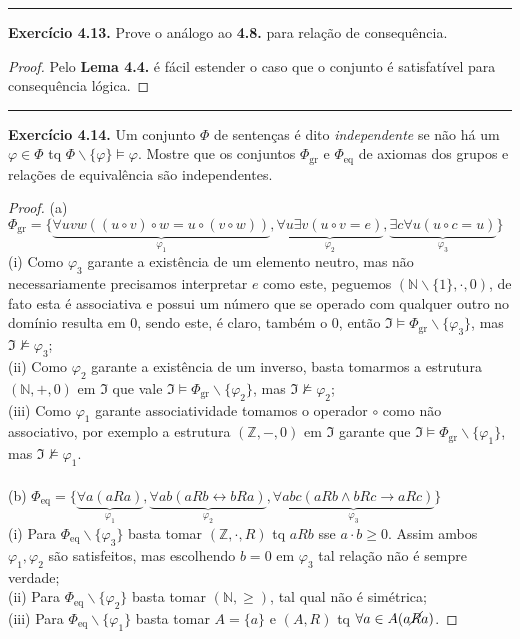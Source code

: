 \documentclass[11pt]{article}
\newcommand{\sse}{\leftrightarrow}
\newcommand{\mf}[1]{\mathfrak{#1}}
\newcommand{\mbb}[1]{\mathbb{#1}}
\begin{document}
\hrule

\begin{shaded}
\textbf{Exercício 4.13.}
Prove o análogo ao \textbf{4.8.} para relação de consequência.
\end{shaded}

\begin{proof}
    Pelo \textbf{Lema 4.4.} é fácil estender o caso que o conjunto é satisfatível para consequência lógica.
\end{proof}

\hrule

\begin{shaded}
\textbf{Exercício 4.14.}
Um conjunto $\Phi$ de sentenças é dito \textit{independente} se não há um $\varphi\in\Phi$ tq $\Phi\backslash\{\varphi\}\vDash\varphi$. Mostre que os conjuntos $\Phi_\text{gr}$ e $\Phi_\text{eq}$ de axiomas dos grupos e relações de equivalência são independentes.
\end{shaded}

\begin{proof}
    (a) $\Phi_\text{gr} = \{\underbrace{\forall uvw((u\circ v)\circ w=u\circ(v\circ w))}_{\varphi_1},\underbrace{\forall u\exists v(u\circ v=e)}_{\varphi_2},\underbrace{\exists c\forall u(u\circ c=u)}_{\varphi_3}\}$\\
    (i) Como $\varphi_3$ garante a existência de um elemento neutro, mas não necessariamente precisamos interpretar $e$ como este, peguemos $(\mbb{N}\backslash\{1\},\cdot,0)$, de fato esta é associativa e possui um número que se operado com qualquer outro no domínio resulta em $0$, sendo este, é claro, também o $0$, então $\mf{I}\vDash\Phi_\text{gr}\backslash\{\varphi_3\}$, mas $\mf{I}\nvDash\varphi_3$; \\
    (ii) Como $\varphi_2$ garante a existência de um inverso, basta tomarmos a estrutura $(\mbb{N},+,0)$ em $\mf{I}$ que vale $\mf{I}\vDash\Phi_\text{gr}\backslash\{\varphi_2\}$, mas $\mf{I}\nvDash\varphi_2$;\\
    (iii) Como $\varphi_1$ garante associatividade tomamos o operador $\circ$ como não associativo, por exemplo a estrutura $(\mbb{Z},-,0)$ em $\mf{I}$ garante que $\mf{I}\vDash\Phi_\text{gr}\backslash\{\varphi_1\}$, mas $\mf{I}\nvDash\varphi_1$.\\\\
    (b) $\Phi_\text{eq} = \{\underbrace{\forall a(aRa)}_{\varphi_1},\underbrace{\forall ab(aRb\sse bRa)}_{\varphi_2},\underbrace{\forall abc(aRb\wedge bRc\to aRc)}_{\varphi_3}\}$\\
    (i) Para $\Phi_\text{eq}\backslash\{\varphi_3\}$ basta tomar $(\mbb{Z},\cdot,R)$ tq $aRb$ sse $a\cdot b \ge 0$. Assim ambos $\varphi_1,\varphi_2$ são satisfeitos, mas escolhendo $b=0$ em $\varphi_3$ tal relação não é sempre verdade;\\
    (ii) Para $\Phi_\text{eq}\backslash\{\varphi_2\}$ basta tomar $(\mbb{N},\ge)$, tal qual não é simétrica;\\
    (iii) Para $\Phi_\text{eq}\backslash\{\varphi_1\}$ basta tomar $A=\{a\}$ e $(A,R)$ tq $\forall a\in A(a\cancel{R}a)$.
\end{proof}
\end{document}
